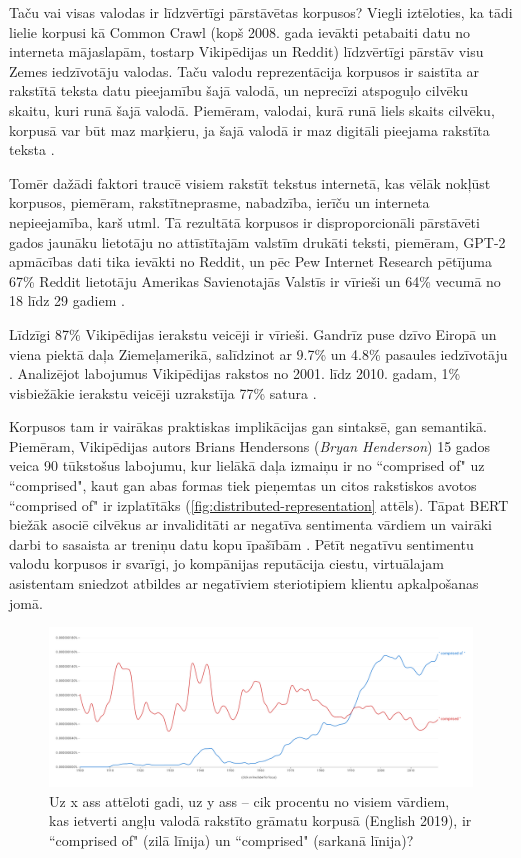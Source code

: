 Taču vai visas valodas ir līdzvērtīgi pārstāvētas korpusos? Viegli iztēloties, ka tādi lielie korpusi kā Common Crawl (kopš 2008. gada ievākti petabaiti datu no interneta mājaslapām, tostarp Vikipēdijas un Reddit) līdzvērtīgi pārstāv visu Zemes iedzīvotāju valodas. Taču valodu reprezentācija korpusos ir saistīta ar rakstītā teksta datu pieejamību šajā valodā, un neprecīzi atspoguļo cilvēku skaitu, kuri runā šajā valodā. Piemēram, valodai, kurā runā liels skaits cilvēku, korpusā var būt maz marķieru, ja šajā valodā ir maz digitāli pieejama rakstīta teksta \cite{bender2021}.

Tomēr dažādi faktori traucē visiem rakstīt tekstus internetā, kas vēlāk nokļūst korpusos, piemēram, rakstītneprasme, nabadzība, ierīču un interneta nepieejamība, karš utml. Tā rezultātā korpusos ir disproporcionāli pārstāvēti gados jaunāku lietotāju no attīstītajām valstīm drukāti teksti, piemēram, GPT-2 apmācības dati tika ievākti no Reddit, un pēc Pew Internet Research pētījuma 67\% Reddit lietotāju Amerikas Savienotajās Valstīs ir vīrieši un 64\% vecumā no 18 līdz 29 gadiem \cite{bender2021}.

Līdzīgi 87\% Vikipēdijas ierakstu veicēji ir vīrieši. Gandrīz puse dzīvo Eiropā un viena piektā daļa Ziemeļamerikā, salīdzinot ar 9.7\% un 4.8\% pasaules iedzīvotāju \cite{wikimedia2020}. Analizējot labojumus Vikipēdijas rakstos no 2001. līdz 2010. gadam, 1\% visbiežākie ierakstu veicēji uzrakstīja 77\% satura \cite{1percent}.

Korpusos tam ir vairākas praktiskas implikācijas gan sintaksē, gan semantikā. Piemēram, Vikipēdijas autors Brians Hendersons (\textit{Bryan Henderson}) 15 gados veica 90 tūkstošus labojumu, kur lielākā daļa izmaiņu ir no “comprised of" uz “comprised", kaut gan abas formas tiek pieņemtas un citos rakstiskos avotos “comprised of" ir izplatītāks (\ref{fig:distributed-representation} attēls). Tāpat BERT biežāk asociē cilvēkus ar invaliditāti ar negatīva sentimenta vārdiem un vairāki darbi to sasaista ar treniņu datu kopu īpašībām \cite{bender2021}. Pētīt negatīvu sentimentu valodu korpusos ir svarīgi, jo kompānijas reputācija ciestu, virtuālajam asistentam sniedzot atbildes ar negatīviem steriotipiem klientu apkalpošanas jomā.


\begin{figure}[h]
    \centering
    \includegraphics[width=\textwidth]{figures/comprised.png}
    \caption{Uz x ass attēloti gadi, uz y ass -- cik procentu no visiem vārdiem, kas ietverti angļu valodā rakstīto grāmatu korpusā (English 2019), ir “comprised of" (zilā līnija) un “comprised" (sarkanā līnija)? \cite{ngram-viewer}}
    \label{fig:comprised}
\end{figure}

